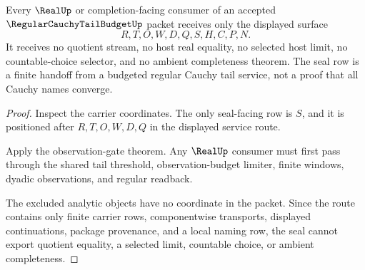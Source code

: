 \begin{theorem}
\label{thm:regular-cauchy-tail-budget-seal-nonescape}
Every $\RealUp$ or completion-facing consumer of an accepted $\RegularCauchyTailBudgetUp$ packet receives only the displayed surface
$$
R,T,O,W,D,Q,S,H,C,P,N.
$$
It receives no quotient stream, no host real equality, no selected host limit, no countable-choice selector, and no ambient completeness theorem. The seal row is a finite handoff from a budgeted regular Cauchy tail service, not a proof that all Cauchy names converge.
\end{theorem}
\begin{proof}
Inspect the carrier coordinates. The only seal-facing row is $S$, and it is positioned after $R,T,O,W,D,Q$ in the displayed service route.

Apply the observation-gate theorem. Any $\RealUp$ consumer must first pass through the shared tail threshold, observation-budget limiter, finite windows, dyadic observations, and regular readback.

The excluded analytic objects have no coordinate in the packet. Since the route contains only finite carrier rows, componentwise transports, displayed continuations, package provenance, and a local naming row, the seal cannot export quotient equality, a selected limit, countable choice, or ambient completeness.
\end{proof}

